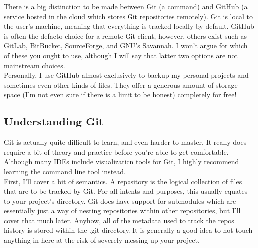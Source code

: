 \documentclass{article}
\begin{document}
There is a big distinction to be made between Git (a command) and GitHub (a service hosted in the cloud which 
stores Git repositories remotely). Git is local to the user's machine, meaning that everything is tracked 
locally by default. GitHub is often the defacto choice for a remote Git client, however, others exist such as 
GitLab, BitBucket, SourceForge, and GNU's Savannah. I won't argue for which of these you ought to use, although 
I will say that latter two options are not mainstream choices.\\

Personally, I use GitHub almost exclusively to backup my personal projects and sometimes even other kinds of 
files. They offer a generous amount of storage space (I'm not even sure if there is a limit to be honest) 
completely for free! 

\subsection{Understanding Git}

Git is actually quite difficult to learn, and even harder to master. It really does require a bit of theory 
and practice before you're able to get comfortable. Although many IDEs include visualization tools for Git, I 
highly recommend learning the command line tool instead.\\

First, I'll cover a bit of semantics. A repository is the logical collection of files that are to be tracked 
by Git. For all intents and purposes, this usually equates to your project's directory. Git does have support 
for submodules which are essentially just a way of nesting repositories within other repositories, but I'll 
cover that much later. Anyhow, all of the metadata used to track the repos history is stored within the .git 
directory. It is generally a good idea to not touch anything in here at the risk of severely messing up your 
project.\\
\end{document}
